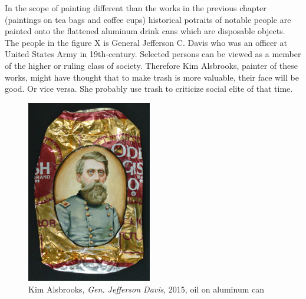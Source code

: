 

In the scope of painting different than the works in the previous chapter (paintings on tea bags and coffee cups) historical potraits of notable people are painted onto the flattened aluminum drink cans which are disposable objects. The people in the figure X is General Jefferson C. Davis who was an officer at United States Army in 19th-century. Selected persons can be viewed as a member of the higher or ruling class of society. Therefore Kim Alsbrooks, painter of these works, might have thought that to make trash is more valuable, their face will be good. Or vice versa. She probably use trash to criticize social elite of that time. 

\begin{figure}[h!]
  \centering
  \includegraphics[height=8cm]{graphics/Alsbrooks.jpg}
  \caption{Kim Alsbrooks, \textit{Gen. Jefferson Davis}, 2015, oil on aluminum can}
  \label{fig:Alsbrooks}
\end{figure}

